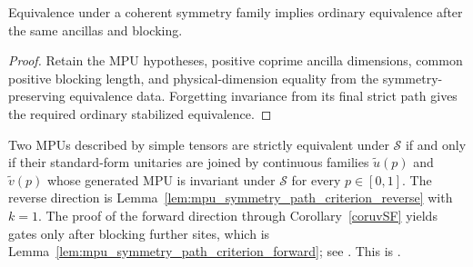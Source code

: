 \begin{lemma}
    \label{thm:mpu_symmetry_equivalence_forget}
    \leanok
    Equivalence under a coherent symmetry family implies ordinary
    equivalence after the same ancillas and blocking.
\end{lemma}

\begin{proof}\leanok
    Retain the MPU hypotheses, positive coprime ancilla dimensions, common
    positive blocking length, and physical-dimension equality from the
    symmetry-preserving equivalence data. Forgetting invariance from its final strict
    path gives the required ordinary stabilized equivalence.
\end{proof}

\begin{lemma}
    \label{lem:equivalent-symmetry}
    \notready
    Two MPUs described by simple tensors are strictly equivalent under
    $\mathcal S$ if and only if their standard-form unitaries are joined by
    continuous families $\widetilde u(p)$ and $\widetilde v(p)$ whose generated
    MPU is invariant under $\mathcal S$ for every $p\in[0,1]$. The reverse
    direction is Lemma~\ref{lem:mpu_symmetry_path_criterion_reverse} with $k=1$.
    The proof of the forward direction through Corollary~\ref{coruvSF} yields
    gates only after blocking further sites, which is
    Lemma~\ref{lem:mpu_symmetry_path_criterion_forward}; see
    \cite{gap:mpu_symmetry_path_criterion_blocking}. This is
    \cite[Lemma~VI.3]{Cirac2017MPU}.
\end{lemma}


